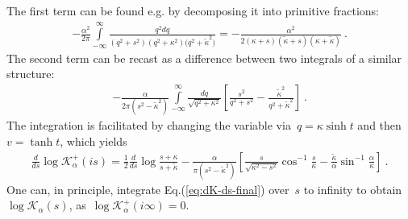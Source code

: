 \documentclass[preprint,aps,eqsecnum, prb]{revtex4-1}
\newcommand{\fplus}[1]{{#1}^{+}}
\begin{document}
The first term can be found e.g. by decomposing it
into primitive fractions:
\begin{align}
  -\frac{\alpha^2}{2\pi}\int\limits_{-\infty}^{\infty}
  \frac{q^2 dq}{(q^2 + s^2) (q^2 + \kappa^2)
  (q^2 + {\tilde{\kappa}^2)}} =
  -\frac{\alpha^2}{2(\kappa + s) ({\tilde{\kappa}} + s)
  (\kappa + {\tilde\kappa})}\ .
\end{align}
The second term can be recast as a difference between
two integrals of a similar structure:
\begin{align}
  -\frac{\alpha}{2\pi(s^2 - \tilde{\kappa}^2)}
  \int\limits_{-\infty}^{\infty}
  \frac{dq}{\sqrt{q^2 + \kappa^2}}
  \left[\frac{s^2}{q^2 + s^2}
  - \frac{\tilde{\kappa}^2}{q^2 + {\tilde\kappa}^2}\right]\ .
\end{align}
The integration is facilitated by changing the variable
via~$q = \kappa \sinh t$ and then~$v = \tanh t$,
which yields
\begin{align}
  \label{eq:dK-ds-final}
  \frac{d}{ds} \log \fplus{\mathcal{K}}_{\alpha}(is) =
  \frac{1}{2}\frac{d}{ds} \log\frac{s + \kappa}{s + \tilde{\kappa}}
  - \frac{\alpha}{\pi (s^2 -\tilde{\kappa}^2)}
  \left[\frac{s}{\sqrt{\kappa^2 - s^2}} \cos^{-1}\frac{s}{\kappa}
  - \frac{{\tilde{\kappa}}}{\alpha}
  \sin^{-1}\frac{\alpha}{\kappa}\right]
  \ .
\end{align}
One can, in principle, integrate Eq.(\ref{eq:dK-ds-final})
over~$s$ to infinity to obtain~$\log\mathcal{K}_\alpha(s)$,
as~$\log\fplus{\mathcal{K}}_\alpha(i\infty) = 0$.
\end{document}
